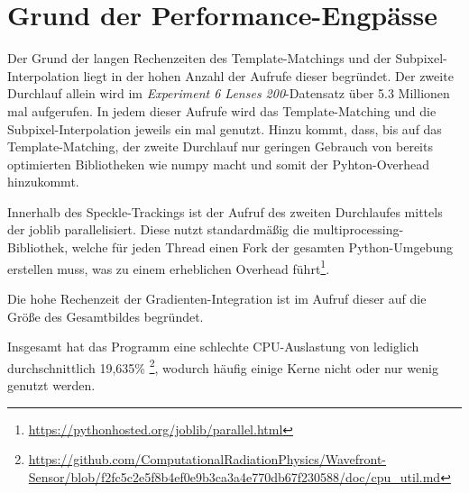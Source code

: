 \section{Grund der Performance-Engpässe}

Der Grund der langen Rechenzeiten des Template-Matchings und der Subpixel-Interpolation liegt in der hohen Anzahl der Aufrufe dieser begründet. Der zweite Durchlauf allein wird im \textit{Experiment 6 Lenses 200}-Datensatz über 5.3 Millionen mal aufgerufen. In jedem dieser Aufrufe wird das Template-Matching und die Subpixel-Interpolation jeweils ein mal genutzt. Hinzu kommt, dass, bis auf das Temp\-late-Match\-ing, der zweite Durchlauf nur geringen Gebrauch von bereits optimierten Bibliotheken wie numpy macht und somit der Pyhton-Overhead hinzukommt. 

Innerhalb des Speckle-Trackings ist der Aufruf des zweiten Durchlaufes mittels der joblib parallelisiert. Diese nutzt standardmäßig die multiprocessing-Bibliothek, welche für jeden Thread einen Fork der gesamten Python-Umgebung erstellen muss, was zu einem erheblichen Overhead führt\footnote{\url{https://pythonhosted.org/joblib/parallel.html}}.

Die hohe Rechenzeit der Gradienten-Integration ist im Aufruf dieser auf die Größe des Gesamtbildes begründet.

Insgesamt hat das Programm eine schlechte CPU-Auslastung von lediglich durchschnittlich 19,635\% \footnote{\url{https://github.com/ComputationalRadiationPhysics/Wavefront-Sensor/blob/f2fc5c2e5f8b4ef0e9b3ca3a4e770db67f230588/doc/cpu_util.md}}, wodurch häufig einige Kerne nicht oder nur wenig genutzt werden. 